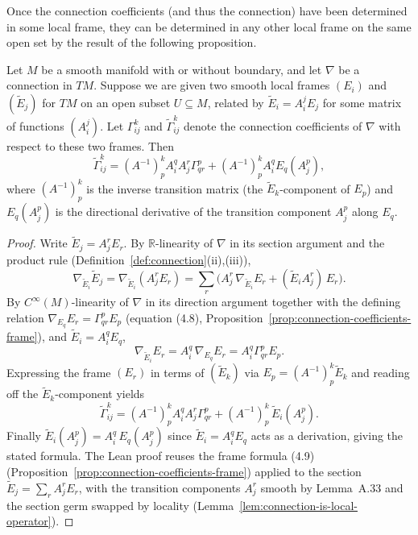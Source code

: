 Once the connection coefficients (and thus the connection) have been determined in some local frame, they can be determined in any other local frame on the same open set by the result of the following proposition.

\begin{proposition}
\label{prop:transformation-law-connection-coefficients}
\leanok
Let $M$ be a smooth manifold with or without boundary, and let $\nabla$ be a connection in $TM$. Suppose we are given two smooth local frames $(E_i)$ and $(\tilde{E}_j)$ for $TM$ on an open subset $U \subseteq M$, related by $\tilde{E}_i = A^j_i E_j$ for some matrix of functions $(A^j_i)$. Let $\Gamma^k_{ij}$ and $\tilde{\Gamma}^k_{ij}$ denote the connection coefficients of $\nabla$ with respect to these two frames. Then
\[
\tilde{\Gamma}^k_{ij} = (A^{-1})^k_p A^q_i A^r_j \Gamma^p_{qr} + (A^{-1})^k_p A^q_i E_q(A^p_j),
\]
where $(A^{-1})^k_p$ is the inverse transition matrix (the $\tilde{E}_k$-component of $E_p$) and $E_q(A^p_j)$ is the directional derivative of the transition component $A^p_j$ along $E_q$.
\end{proposition}

\begin{proof}
\leanok
Write $\tilde{E}_j = A^r_j E_r$. By $\mathbb{R}$-linearity of $\nabla$ in its section argument and the product rule (Definition~\ref{def:connection}(ii),(iii)),
\[
\nabla_{\tilde{E}_i}\tilde{E}_j = \nabla_{\tilde{E}_i}(A^r_j E_r)
  = \sum_r \big( A^r_j\, \nabla_{\tilde{E}_i} E_r + (\tilde{E}_i A^r_j)\, E_r \big).
\]
By $C^\infty(M)$-linearity of $\nabla$ in its direction argument together with the defining relation $\nabla_{E_q} E_r = \Gamma^p_{qr} E_p$ (equation (4.8), Proposition~\ref{prop:connection-coefficients-frame}), and $\tilde{E}_i = A^q_i E_q$,
\[
\nabla_{\tilde{E}_i} E_r = A^q_i\, \nabla_{E_q} E_r = A^q_i \Gamma^p_{qr} E_p.
\]
Expressing the frame $(E_r)$ in terms of $(\tilde{E}_k)$ via $E_p = (A^{-1})^k_p \tilde{E}_k$ and reading off the $\tilde{E}_k$-component yields
\[
\tilde{\Gamma}^k_{ij} = (A^{-1})^k_p A^q_i A^r_j \Gamma^p_{qr} + (A^{-1})^k_p\, \tilde{E}_i(A^p_j).
\]
Finally $\tilde{E}_i(A^p_j) = A^q_i\, E_q(A^p_j)$ since $\tilde{E}_i = A^q_i E_q$ acts as a derivation, giving the stated formula. The Lean proof reuses the frame formula (4.9) (Proposition~\ref{prop:connection-coefficients-frame}) applied to the section $\tilde{E}_j = \sum_r A^r_j E_r$, with the transition components $A^r_j$ smooth by Lemma~A.33 and the section germ swapped by locality (Lemma~\ref{lem:connection-is-local-operator}).
\end{proof}

